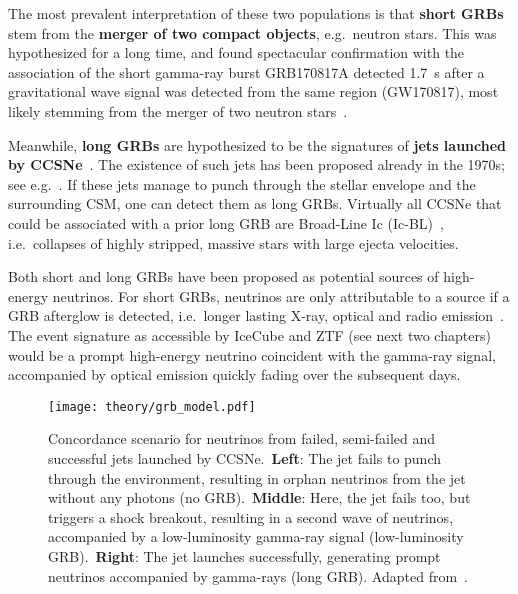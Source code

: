 The most prevalent interpretation of these two populations is that \textbf{short GRBs} stem from the \textbf{merger of two compact objects}, e.g.~neutron stars. This was hypothesized for a long time, and found spectacular confirmation with the association of the short gamma-ray burst GRB170817A detected \SI{1.7}{\s} after a gravitational wave signal was detected from the same region (GW170817), most likely stemming from the merger of two neutron stars~.

Meanwhile, \textbf{long GRBs} are hypothesized to be the signatures of \textbf{jets launched by CCSNe}~. The existence of such jets has been proposed already in the 1970s; see e.g.~. If these jets manage to punch through the stellar envelope and the surrounding CSM, one can detect them as long GRBs. Virtually all CCSNe that could be associated with a prior long GRB are Broad-Line Ic (Ic-BL)~, i.e.\ collapses of highly stripped, massive stars with large ejecta velocities.

Both short and long GRBs have been proposed as potential sources of high-energy neutrinos. For short GRBs, neutrinos are only attributable to a source if a GRB afterglow is detected, i.e.\ longer lasting X-ray, optical and radio emission~. The event signature as accessible by IceCube and ZTF (see next two chapters) would be a prompt high-energy neutrino coincident with the gamma-ray signal, accompanied by optical emission quickly fading over the subsequent days.

\begin{figure*}[htb]
    \texttt{[image: theory/grb\_model.pdf]}
    \caption[High-energy neutrinos from GRBs]{Concordance scenario for neutrinos from failed, semi-failed and successful jets launched by CCSNe.\ \textbf{Left}: The jet fails to punch through the environment, resulting in orphan neutrinos from the jet without any photons (no GRB).\ \textbf{Middle}: Here, the jet fails too, but triggers a shock breakout, resulting in a second wave of neutrinos, accompanied by a low-luminosity gamma-ray signal (low-luminosity GRB).\ \textbf{Right}: The jet launches successfully, generating prompt neutrinos accompanied by gamma-rays (long GRB). Adapted from~\cite{Senno2016}.}
\end{figure*}

